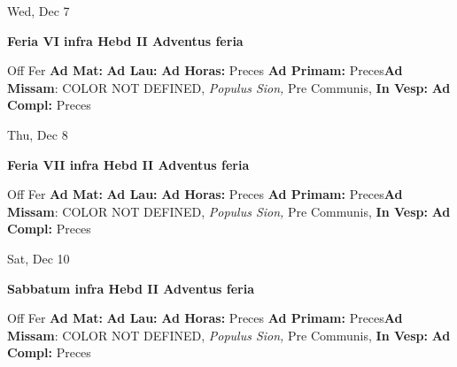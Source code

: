 \documentclass[10pt]{memoir}
\begin{document}
\begin{center}
\begin{minipage}{3.5in}
\vspace{2em}
\begin{center}Wed, Dec 7
\end{center}
\textbf{ \large Feria VI infra Hebd II Adventus
\textnormal{\normalsize feria}}

\begin{justify}Off Fer
\textbf{Ad Mat: }
\textbf{Ad Lau: }
\textbf{Ad Horas: }Preces
\textbf{Ad Primam: }Preces\textbf{Ad Missam}: COLOR NOT DEFINED, \textit{Populus Sion,} Pre Communis, 
\textbf{In Vesp: }
\textbf{Ad Compl: }Preces
\end{justify}
\end{minipage}
\end{center}

\begin{center}
\begin{minipage}{3.5in}
\vspace{2em}
\begin{center}Thu, Dec 8
\end{center}
\textbf{ \large Feria VII infra Hebd II Adventus
\textnormal{\normalsize feria}}

\begin{justify}Off Fer
\textbf{Ad Mat: }
\textbf{Ad Lau: }
\textbf{Ad Horas: }Preces
\textbf{Ad Primam: }Preces\textbf{Ad Missam}: COLOR NOT DEFINED, \textit{Populus Sion,} Pre Communis, 
\textbf{In Vesp: }
\textbf{Ad Compl: }Preces
\end{justify}
\end{minipage}
\end{center}

\begin{center}
\begin{minipage}{3.5in}
\vspace{2em}
\begin{center}Sat, Dec 10
\end{center}
\textbf{ \large Sabbatum infra Hebd II Adventus
\textnormal{\normalsize feria}}

\begin{justify}Off Fer
\textbf{Ad Mat: }
\textbf{Ad Lau: }
\textbf{Ad Horas: }Preces
\textbf{Ad Primam: }Preces\textbf{Ad Missam}: COLOR NOT DEFINED, \textit{Populus Sion,} Pre Communis, 
\textbf{In Vesp: }
\textbf{Ad Compl: }Preces
\end{justify}
\end{minipage}
\end{center}
\end{document}
